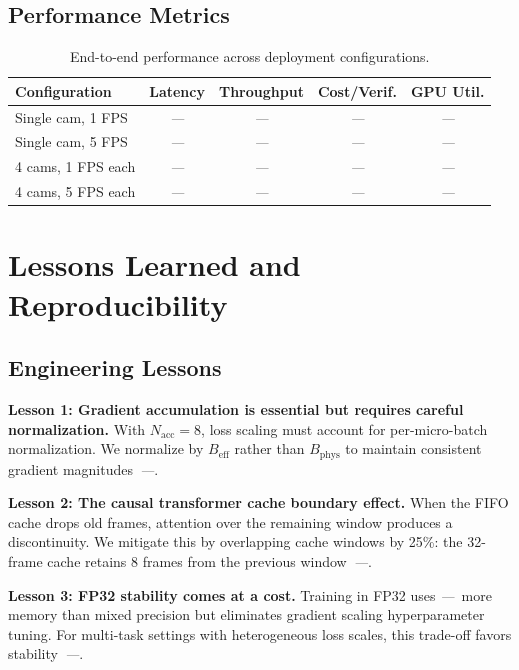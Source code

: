 \documentclass[10pt,twocolumn]{article}
\newcommand{\todo}{\textit{---}}
\newcommand{\popwres}{\todo}
\begin{document}
\subsection{Performance Metrics}

\begin{table}[htbp]
\centering
\small
\caption{End-to-end performance across deployment configurations.}
\label{tab:deployment-configs}
\begin{tabular}{l c c c c}
\toprule
\textbf{Configuration} & \textbf{Latency} & \textbf{Throughput} & \textbf{Cost/Verif.} & \textbf{GPU Util.} \\
\midrule
Single cam, 1 FPS & \popwres & \popwres & \popwres & \popwres \\
Single cam, 5 FPS & \popwres & \popwres & \popwres & \popwres \\
4 cams, 1 FPS each & \popwres & \popwres & \popwres & \popwres \\
4 cams, 5 FPS each & \popwres & \popwres & \popwres & \popwres \\
\bottomrule
\end{tabular}
\end{table}

\FloatBarrier

\section{Lessons Learned and Reproducibility}
\label{sec:lessons}

\subsection{Engineering Lessons}

\textbf{Lesson 1: Gradient accumulation is essential but requires careful normalization.} With $N_{\text{acc}}=8$, loss scaling must account for per-micro-batch normalization. We normalize by $B_{\text{eff}}$ rather than $B_{\text{phys}}$ to maintain consistent gradient magnitudes~\popwres.

\textbf{Lesson 2: The causal transformer cache boundary effect.} When the FIFO cache drops old frames, attention over the remaining window produces a discontinuity. We mitigate this by overlapping cache windows by 25\%: the 32-frame cache retains 8 frames from the previous window~\popwres.

\textbf{Lesson 3: FP32 stability comes at a cost.} Training in FP32 uses \popwres~more memory than mixed precision but eliminates gradient scaling hyperparameter tuning. For multi-task settings with heterogeneous loss scales, this trade-off favors stability~\popwres.
\end{document}
